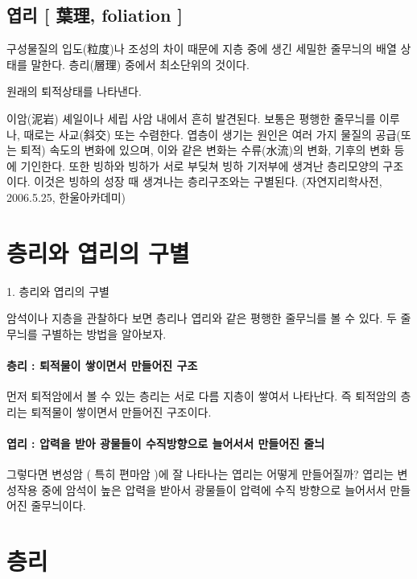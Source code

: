 \documentclass[12pt, a4paper, oneside]{book}
\begin{document}
	\subsection{엽리 [ 葉理, foliation ] }


구성물질의 입도(粒度)나 조성의 차이 때문에 지층 중에 생긴 세밀한 줄무늬의 배열 상태를 말한다. 층리(層理) 중에서 최소단위의 것이다. 

원래의 퇴적상태를 나타낸다. 

이암(泥岩) 셰일이나 세립 사암 내에서 흔히 발견된다. 보통은 평행한 줄무늬를 이루나, 때로는 사교(斜交) 또는 수렴한다. 엽층이 생기는 원인은 여러 가지 물질의 공급(또는 퇴적) 속도의 변화에 있으며, 이와 같은 변화는 수류(水流)의 변화, 기후의 변화 등에 기인한다. 또한 빙하와 빙하가 서로 부딪쳐 빙하 기저부에 생겨난 층리모양의 구조이다. 이것은 빙하의 성장 때 생겨나는 층리구조와는 구별된다.
(자연지리학사전, 2006.5.25, 한울아카데미)






	\newpage  \null
	\section{층리와 엽리의 구별}




1. 		층리와 엽리의 구별

암석이나 지층을 관찰하다 보면 층리나 엽리와 같은 평행한 줄무늬를 볼 수 있다. 두 줄무늬를 구별하는 방법을 알아보자. 

\paragraph{층리 : 퇴적물이 쌓이면서 만들어진 구조}
먼저 퇴적암에서 볼 수 있는 층리는 서로 다름 지층이 쌓여서 나타난다. 즉 퇴적암의 층리는 퇴적물이 쌓이면서 만들어진 구조이다.

\paragraph{엽리 : 압력을 받아 광물들이 수직방향으로 늘어서서 만들어진 줄늬}
그렇다면 변성암 ( 특히 편마암 )에 잘 나타나는 엽리는 어떻게 만들어질까? 엽리는 변성작용 중에 암석이 높은 압력을 받아서 광물들이 압력에 수직 방향으로 늘어서서 만들어진 줄무늬이다.




	\newpage  \null
	\section{층리}
\end{document}
